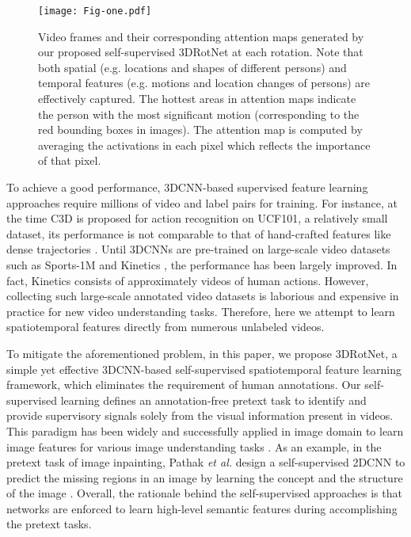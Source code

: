 \documentclass[10pt,twocolumn,letterpaper]{article}
\begin{document}
\begin{figure}
\begin{center}
\texttt{[image: Fig-one.pdf]}
\end{center}
\caption{Video frames and their corresponding attention maps generated by our proposed self-supervised 3DRotNet at each rotation. Note that both spatial (e.g. locations and shapes of different persons) and temporal features (e.g. motions and location changes of persons) are effectively captured. The hottest areas in attention maps indicate the person with the most significant motion (corresponding to the red bounding boxes in images). The attention map is computed by averaging the activations in each pixel which reflects the importance of that pixel.} 
\label{fig:motivation-attention}
\vspace*{-6mm}
\end{figure}

To achieve a good performance, 3DCNN-based supervised feature learning approaches require millions of video and label pairs for training. For instance, at the time C3D \cite{C3D} is proposed for action recognition on UCF101, a relatively small dataset, its performance is not comparable to that of hand-crafted features like dense trajectories \cite{IDT}. Until 3DCNNs are pre-trained on large-scale video datasets such as Sports-1M \cite{Sport-1M} and Kinetics \cite{Kinetics}, the performance has been largely improved. In fact, Kinetics consists of approximately  videos of  human actions. However, collecting such large-scale annotated video datasets is laborious and expensive in practice for new video understanding tasks. Therefore, here we attempt to learn spatiotemporal features directly from numerous unlabeled videos. 

To mitigate the aforementioned problem, in this paper, we propose 3DRotNet, a simple yet effective 3DCNN-based self-supervised spatiotemporal feature learning framework, which eliminates the requirement of human annotations. Our self-supervised learning defines an annotation-free pretext task to identify and provide supervisory signals solely from the visual information present in videos. This paradigm has been widely and successfully applied in image domain to learn image features for various image understanding tasks \cite{deepcluster, contextprediction, O3N, larsson2017colorproxy, shuffleandlearn,  jigsaw, watchingmove, inpainting, SynGAN}. As an example, in the pretext task of image inpainting, Pathak \textit{et al.} design a self-supervised 2DCNN to predict the missing regions in an image by learning the concept and the structure of the image \cite{inpainting}. Overall, the rationale behind the self-supervised approaches is that networks are enforced to learn high-level semantic features during accomplishing the pretext tasks. 
\end{document}
